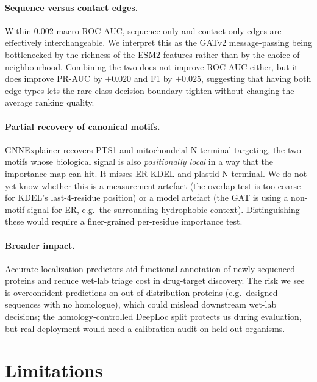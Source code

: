 \documentclass{article}
\begin{document}
\paragraph{Sequence versus contact edges.}
Within $0.002$ macro ROC-AUC, sequence-only and contact-only edges are
effectively interchangeable. We interpret this as the GATv2
message-passing being bottlenecked by the richness of the ESM2 features
rather than by the choice of neighbourhood. Combining the two does not improve ROC-AUC
either, but it does improve PR-AUC by $+0.020$ and F1 by $+0.025$,
suggesting that having both edge types lets the rare-class decision
boundary tighten without changing the average ranking quality.

\paragraph{Partial recovery of canonical motifs.}
GNNExplainer recovers PTS1 and mitochondrial N-terminal targeting, the
two motifs whose biological signal is also \emph{positionally local}
in a way that the importance map can hit. It misses ER KDEL and
plastid N-terminal. We do not yet know whether this is a measurement
artefact (the overlap test is too coarse for KDEL's last-4-residue
position) or a model artefact (the GAT is using a non-motif signal for
ER, e.g.\ the surrounding hydrophobic context). Distinguishing these
would require a finer-grained per-residue importance test.

\paragraph{Broader impact.}
Accurate localization predictors aid functional annotation of newly
sequenced proteins and reduce wet-lab triage cost in drug-target
discovery. The risk we see is overconfident predictions on
out-of-distribution proteins (e.g.\ designed sequences with no
homologue), which could mislead downstream wet-lab decisions; the
homology-controlled DeepLoc split protects us during evaluation, but
real deployment would need a calibration audit on held-out organisms.

\section{Limitations}\label{sec:limitations}
\end{document}
